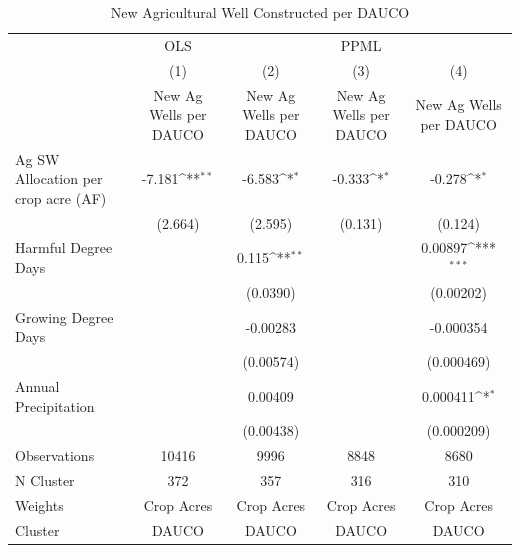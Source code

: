 \begin{table}[htbp]\centering
\def\sym#1{\ifmmode^{#1}\else\(^{#1}\)\fi}
\caption{New Agricultural Well Constructed per DAUCO}
\begin{tabular}{l*{4}{c}}
\hline\hline
                    &         OLS         &                     &        PPML         &                     \\
                    &\multicolumn{1}{c}{(1)}&\multicolumn{1}{c}{(2)}&\multicolumn{1}{c}{(3)}&\multicolumn{1}{c}{(4)}\\
                    &\multicolumn{1}{c}{New Ag Wells per DAUCO}&\multicolumn{1}{c}{New Ag Wells per DAUCO}&\multicolumn{1}{c}{New Ag Wells per DAUCO}&\multicolumn{1}{c}{New Ag Wells per DAUCO}\\
\hline
Ag SW Allocation per crop acre (AF)&      -7.181\sym{**} &      -6.583\sym{*}  &      -0.333\sym{*}  &      -0.278\sym{*}  \\
                    &     (2.664)         &     (2.595)         &     (0.131)         &     (0.124)         \\
[1em]
Harmful Degree Days &                     &       0.115\sym{**} &                     &     0.00897\sym{***}\\
                    &                     &    (0.0390)         &                     &   (0.00202)         \\
[1em]
Growing Degree Days &                     &    -0.00283         &                     &   -0.000354         \\
                    &                     &   (0.00574)         &                     &  (0.000469)         \\
[1em]
Annual Precipitation&                     &     0.00409         &                     &    0.000411\sym{*}  \\
                    &                     &   (0.00438)         &                     &  (0.000209)         \\
\hline
Observations        &       10416         &        9996         &        8848         &        8680         \\
N Cluster           &         372         &         357         &         316         &         310         \\
Weights             &  Crop Acres         &  Crop Acres         &  Crop Acres         &  Crop Acres         \\
Cluster             &       DAUCO         &       DAUCO         &       DAUCO         &       DAUCO         \\

\end{tabular}
\end{table}
